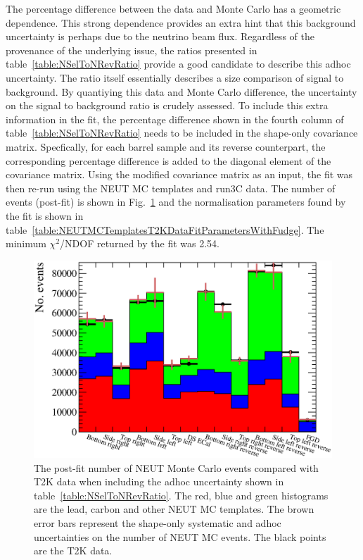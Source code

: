 The percentage difference between the data and Monte Carlo has a geometric dependence.  This strong dependence provides an extra hint that this background uncertainty is perhaps due to the neutrino beam flux.  Regardless of the provenance of the underlying issue, the ratios presented in table~\ref{table:NSelToNRevRatio} provide a good candidate to describe this adhoc uncertainty.  The ratio itself essentially describes a size comparison of signal to background.  By quantiying this data and Monte Carlo difference, the uncertainty on the signal to background ratio is crudely assessed.  To include this extra information in the fit, the percentage difference shown in the fourth column of table~\ref{table:NSelToNRevRatio} needs to be included in the shape-only covariance matrix.  Specfically, for each barrel sample and its reverse counterpart, the corresponding percentage difference is added to the diagonal element of the covariance matrix.  Using the modified covariance matrix as an input, the fit was then re-run using the NEUT MC templates and run3C data.  The number of events (post-fit) is shown in Fig.~\ref{fig:MCTemplatesWithSystematicsT2KDataPostFitWithFudge} and the normalisation parameters found by the fit is shown in table~\ref{table:NEUTMCTemplatesT2KDataFitParametersWithFudge}.  The minimum $\chi^2$/NDOF returned by the fit was 2.54.
\begin{figure}
  \centering
  \includegraphics[width=15cm]{images/measurement/data/MCTemplatesWithSystematics_T2KData_PostFit_WithErrorFudge.eps}
  \caption{The post-fit number of NEUT Monte Carlo events compared with T2K data when including the adhoc uncertainty shown in table~\ref{table:NSelToNRevRatio}.  The red, blue and green histograms are the lead, carbon and other NEUT MC templates.  The brown error bars represent the shape-only systematic and adhoc uncertainties on the number of NEUT MC events.  The black points are the T2K data.}
  \label{fig:MCTemplatesWithSystematicsT2KDataPostFitWithFudge}
\end{figure}
